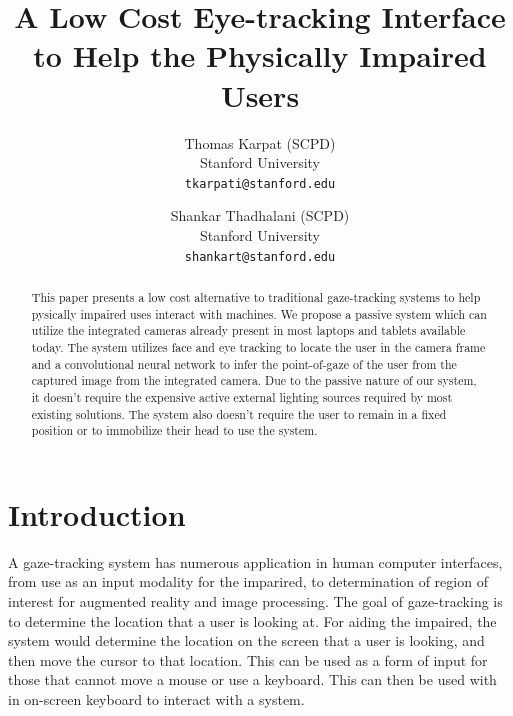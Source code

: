 \documentclass[10pt,twocolumn,letterpaper]{article}
\begin{document}
\title{A Low Cost Eye-tracking Interface to Help the Physically
  Impaired Users}

\author{Thomas Karpat (SCPD)\\
Stanford University \\
{\tt\small tkarpati@stanford.edu}
\and
Shankar Thadhalani (SCPD)\\
Stanford University \\
{\tt\small shankart@stanford.edu}
}

\maketitle

\begin{abstract}
This paper presents a low cost alternative to traditional
gaze-tracking systems to help pysically impaired uses interact with
machines. We propose a passive system which can utilize the integrated
cameras already present in most laptops and tablets available
today. The system utilizes face and eye tracking to locate the user in
the camera frame and a convolutional neural network to infer the
point-of-gaze of the user from the captured image from the integrated
camera. Due to the passive nature of our system, it doesn't require
the expensive active external lighting sources required by most
existing solutions. The system also doesn't require the user to remain
in a fixed position or to immobilize their head to use the system.
\end{abstract}

\section{Introduction}
A gaze-tracking system has numerous application in human computer
interfaces, from use as an input modality for the imparired\cite{calvo}, to
determination of region of interest for augmented reality and image
processing. The goal of gaze-tracking is to determine the location
that a user is looking at. For aiding the impaired, the system would
determine the location on the screen that a user is looking, and then
move the cursor to that location. This can be used as a form of input
for those that cannot move a mouse or use a keyboard. This
can then be used with in on-screen keyboard to interact with a
system.
\end{document}
